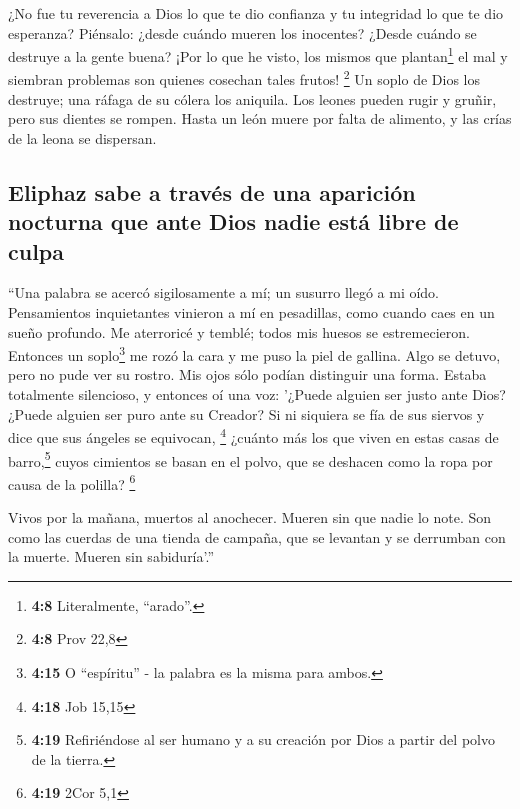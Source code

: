  ¿No fue tu reverencia a Dios lo que te dio confianza y tu
integridad lo que te dio esperanza?  Piénsalo: ¿desde
cuándo mueren los inocentes? ¿Desde cuándo se destruye a la gente buena?
 ¡Por lo que he visto, los mismos que plantan\footnote{\textbf{4:8}
  Literalmente, ``arado''.} el mal y siembran problemas son quienes
cosechan tales frutos! \footnote{\textbf{4:8} Prov 22,8} 
Un soplo de Dios los destruye; una ráfaga de su cólera los aniquila.
 Los leones pueden rugir y gruñir, pero sus dientes se
rompen.  Hasta un león muere por falta de alimento, y las
crías de la leona se dispersan.

\hypertarget{eliphaz-sabe-a-travuxe9s-de-una-apariciuxf3n-nocturna-que-ante-dios-nadie-estuxe1-libre-de-culpa}{%
\subsection{Eliphaz sabe a través de una aparición nocturna que ante
Dios nadie está libre de
culpa}\label{eliphaz-sabe-a-travuxe9s-de-una-apariciuxf3n-nocturna-que-ante-dios-nadie-estuxe1-libre-de-culpa}}

 ``Una palabra se acercó sigilosamente a mí; un susurro
llegó a mi oído.  Pensamientos inquietantes vinieron a mí
en pesadillas, como cuando caes en un sueño profundo.  Me
aterroricé y temblé; todos mis huesos se estremecieron. 
Entonces un soplo\footnote{\textbf{4:15} O ``espíritu'' - la palabra es
  la misma para ambos.} me rozó la cara y me puso la piel de gallina.
 Algo se detuvo, pero no pude ver su rostro. Mis ojos
sólo podían distinguir una forma. Estaba totalmente silencioso, y
entonces oí una voz:  '¿Puede alguien ser justo ante
Dios? ¿Puede alguien ser puro ante su Creador?  Si ni
siquiera se fía de sus siervos y dice que sus ángeles se equivocan,
\footnote{\textbf{4:18} Job 15,15}  ¿cuánto más los que
viven en estas casas de barro,\footnote{\textbf{4:19} Refiriéndose al
  ser humano y a su creación por Dios a partir del polvo de la tierra.}
cuyos cimientos se basan en el polvo, que se deshacen como la ropa por
causa de la polilla? \footnote{\textbf{4:19} 2Cor 5,1}

 Vivos por la mañana, muertos al anochecer. Mueren sin
que nadie lo note.  Son como las cuerdas de una tienda de
campaña, que se levantan y se derrumban con la muerte. Mueren sin
sabiduría'.''

